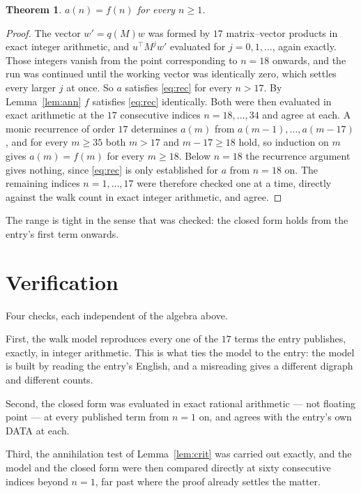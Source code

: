 \documentclass[11pt,a4paper]{article}
\theoremstyle{plain}
\newtheorem{theorem}{Theorem}
\theoremstyle{definition}
\begin{document}
\begin{theorem}
$a(n)=f(n)$ for every $n\ge1$.
\end{theorem}

\begin{proof}
The vector $w'=q(M)w$ was formed by $17$ matrix--vector products in exact integer
arithmetic, and $u^{\!\top}M^{j}w'$ evaluated for $j=0,1,\dots$, again exactly. Those integers
vanish from the point corresponding to $n=18$ onwards, and the run was continued until the
working vector was identically zero, which settles every larger $j$ at once. So $a$ satisfies
\eqref{eq:rec} for every $n>17$. By Lemma~\ref{lem:ann} $f$ satisfies \eqref{eq:rec}
identically. Both were then evaluated in exact arithmetic at the $17$ consecutive indices
$n=18,\dots,34$ and agree at each. A monic recurrence of order $17$
determines $a(m)$ from $a(m-1),\dots,a(m-17)$, and for every $m\ge35$ both
$m>17$ and $m-17\ge18$ hold, so induction on $m$ gives $a(m)=f(m)$ for every
$m\ge18$.
Below $n=18$ the recurrence argument gives nothing, since \eqref{eq:rec} is only
established for $a$ from $n=18$ on. The remaining indices $n=1,\dots,17$ were
therefore checked one at a time, directly against the walk count in exact integer arithmetic,
and agree.
\end{proof}

The range is tight in the sense that was checked: the closed form holds from the entry's first term onwards.

\section{Verification}

Four checks, each independent of the algebra above.

First, the walk model reproduces every one of the $17$ terms the entry publishes,
exactly, in integer arithmetic. This is what ties the model to the entry: the model is built
by reading the entry's English, and a misreading gives a different digraph and different
counts.

Second, the closed form was evaluated in exact rational arithmetic --- not floating point ---
at every published term from $n=1$ on, and agrees with the entry's own DATA at each.

Third, the annihilation test of Lemma~\ref{lem:crit} was carried out exactly, and the model
and the closed form were then compared directly at sixty consecutive indices beyond
$n=1$, far past where the proof already settles the matter.
\end{document}
